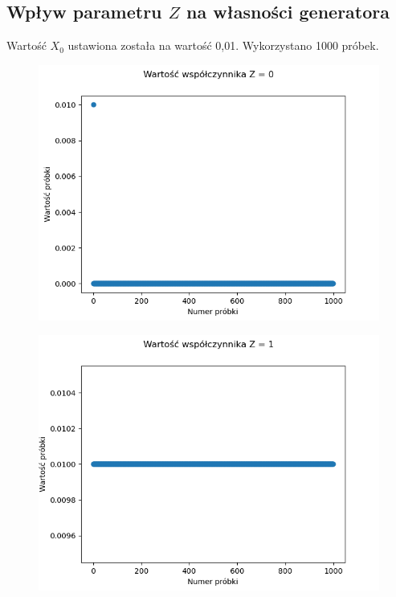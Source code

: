 \documentclass[12pt,a4paper]{article}
\begin{document}
  \subsection{Wpływ parametru $Z$ na własności generatora}

  Wartość $X_0$ ustawiona została na wartość 0,01. Wykorzystano 1000 próbek.

  \begin{figure}[H]
    \centering
    \includegraphics[height=0.3\textheight]{figures/Figure_6.png}
    \label{fig:6}
  \end{figure}

  \begin{figure}[H]
    \centering
    \includegraphics[height=0.3\textheight]{figures/Figure_7.png}
    \label{fig:7}
  \end{figure}
\end{document}
